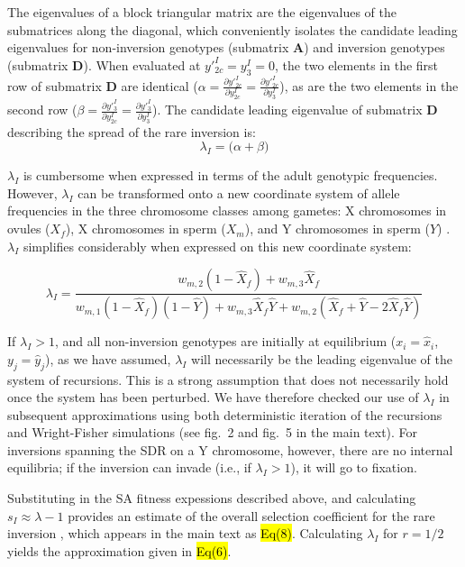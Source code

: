 \documentclass[11pt]{article}
\begin{document}
\noindent The eigenvalues of a block triangular matrix are the eigenvalues of the submatrices along the diagonal, which conveniently isolates the candidate leading eigenvalues for non-inversion genotypes (submatrix $\mathbf{A}$) and inversion genotypes (submatrix $\mathbf{D}$). When evaluated at $y'^I_{2c} = y^I_{3} = 0$, the two elements in the first row of submatrix $\mathbf{D}$ are identical ($ \alpha = \frac{\partial y'^I_{2c}}{\partial y^I_{2c}} = \frac{\partial y'^I_{2c}}{\partial y^I_{3}}$), as are the two elements in the second row ($\beta = \frac{\partial y'^I_{3}}{\partial y^I_{2c}} = \frac{\partial y'^I_{3}}{\partial y^I_{3}}$). The candidate leading eigenvalue of submatrix $\mathbf{D}$ describing the spread of the rare inversion is:
\begin{equation}
	\lambda_{I} = \big( \alpha + \beta \big)
\end{equation}

\noindent $\lambda_I$ is cumbersome when expressed in terms of the adult genotypic frequencies. However, $\lambda_I$ can be transformed onto a new coordinate system of allele frequencies in the three chromosome classes among gametes: X chromosomes in ovules ($X_f$), X chromosomes in sperm ($X_m$), and Y chromosomes in sperm ($Y$) \citep{Clark1987,Otto2011,Otto2014}. $\lambda_I$ simplifies considerably when expressed on this new coordinate system:

\begin{equation}
	\lambda_I = \frac{w_{m,2}(1 - \hat{X}_f) + w_{m,3} \hat{X}_f} {w_{m,1}(1 - \hat{X}_f)(1 - \hat{Y}) + w_{m,3} \hat{X}_f \hat{Y} + w_{m,2} (\hat{X}_f + \hat{Y} - 2 \hat{X}_f \hat{Y})}
\end{equation}

\noindent If $\lambda_I > 1$, and all non-inversion genotypes are initially at equilibrium ($x_i = \hat{x}_i$, $y_j = \hat{y}_j$), as we have assumed, $\lambda_I$ will necessarily be the leading eigenvalue of the system of recursions. This is a strong assumption that does not necessarily hold once the system has been perturbed. We have therefore checked our use of $\lambda_I$ in subsequent approximations using both deterministic iteration of the recursions and Wright-Fisher simulations (see fig.~2 and fig.~5 in the main text). For inversions spanning the SDR on a Y chromosome, however, there are no internal equilibria; if the inversion can invade (i.e., if $\lambda_I > 1$), it will go to fixation. 

Substituting in the SA fitness expessions described above, and calculating $s_I \approx \lambda - 1$ provides an estimate of the overall selection coefficient for the rare inversion \cite{OttoYong2002}, which appears in the main text as \hl{Eq(8)}. Calculating $\lambda_I$ for $r = 1/2$ yields the approximation given in \hl{Eq(6)}.
\end{document}
